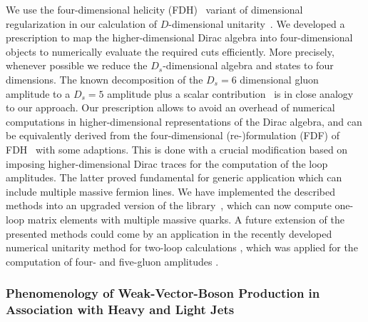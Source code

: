 We use the four-dimensional helicity
(FDH)~\cite{Bern:1991aq,Bern:2002zk} variant of dimensional
regularization in our calculation of $D$-dimensional
unitarity~\cite{Giele:2008ve}. We developed a prescription to map the higher-dimensional
Dirac algebra into four-dimensional objects \cite{angerds} to
numerically evaluate
the required cuts efficiently. More precisely, whenever
possible we reduce the $D_s$-dimensional algebra and states to four dimensions.
The known decomposition of the $D_s=6$ dimensional gluon amplitude to a $D_s=5$
amplitude plus a scalar contribution~\cite{Bern:1994cg} is in close
analogy to our approach. Our prescription allows to avoid an overhead of
numerical computations in higher-dimensional representations of the
Dirac algebra, and can
be equivalently derived from the four-dimensional
(re-)formulation (FDF) of FDH~\cite{Fazio:2014xea} with some adaptions. This is done with
a crucial modification based on imposing higher-dimensional Dirac
traces for the computation of the loop amplitudes. The latter proved
fundamental for generic application which can include multiple massive
fermion lines. We have implemented the described methods into an upgraded version of the \BlackHat{}
library~\cite{Berger:2008sj}, which can now compute one-loop matrix
elements with multiple massive quarks. A future extension of the presented
methods could come by an
application in the recently developed numerical unitarity method for two-loop calculations
\cite{Ita2016,Abreu:2017idw}, which was applied for the computation of four-
\cite{Abreu:2017xsl} and five-gluon amplitudes \cite{Abreu:2017hqn}.

\subsubsection{Phenomenology of Weak-Vector-Boson Production in
  Association with Heavy and Light Jets}
\label{sec:phen-pred-wbb}



